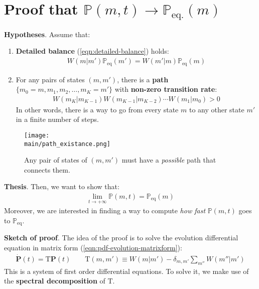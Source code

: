 \documentclass[../../main.tex]{subfiles}
\begin{document}
\section{Proof that $\mathbb{P}(m,t) \to \mathbb{P}_{\mathrm{eq.}}(m)$}\label{sec:proof-db}

\textbf{Hypotheses}. 
Assume that:
\begin{enumerate}
    \item \textbf{Detailed balance} (\ref{eqn:detailed-balance}) holds:
    \begin{align}\label{eqn:hyp-db1}
        {W(m|m') \mathbb{P}_{\mathrm{eq}}(m')} = {W(m'|m) \mathbb{P}_{\mathrm{eq}}(m)} 
    \end{align}
    \item For any pairs of states $(m,m')$, there is a \textbf{path} $\{m_0 = m, m_1, m_2, \dots, m_K = m'\}$ with \textbf{non-zero transition rate}:
    \begin{align}\label{eqn:hyp-2}
        W(m_K|m_{K-1}) W(m_{K-1}|m_{K-2}) \cdots W(m_1|m_0) > 0
    \end{align}
    In other words, there is a way to go from every state $m$ to any other state $m'$ in a finite number of steps. 
\end{enumerate}
\begin{figure}[H]
    \centering
    \texttt{[image: \\main/path\_existance.png]}
    \caption{Any pair of states of $(m,m')$ must have a \textit{possible} path that connects them.}
    \label{fig:path_existance}
\end{figure}
\textbf{Thesis}. 
Then, we want to show that:
\begin{align*}
    \lim_{t \to +\infty} \mathbb{P}(m,t) = \mathbb{P}_{\mathrm{eq}}(m)
\end{align*}
Moreover, we are interested in finding a way to compute \textit{how fast} $\mathbb{P}(m,t)$ goes to $\mathbb{P}_{\mathrm{eq}}$.

\medskip

\textbf{Sketch of proof}. 
The idea of the proof is to solve the evolution differential equation in matrix form (\ref{eqn:pdf-evolution-matrixform}):
\begin{align}\label{eqn:evo-matrixform}
    \dot{\bm{P}}(t) = \mathrm{T} \bm{P}(t) \qquad \mathrm{T}(m,m') \equiv W(m|m') - \delta_{m,m'} \sum_{m''} W(m''|m')
\end{align}
This is a system of first order differential equations. To solve it, we make use of the \textbf{spectral decomposition} of $\mathrm{T}$.
\end{document}
